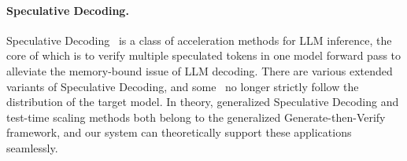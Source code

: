 \paragraph{Speculative Decoding.} Speculative Decoding~\cite{spec-decode,specinfer,zengyixiao-sd} is a class of acceleration methods for LLM inference, the core of which is to verify multiple speculated tokens in one model forward pass to alleviate the memory-bound issue of LLM decoding. There are various extended variants of Speculative Decoding, and some~\cite{hao2024hybrid,reward-guided-sd} no longer strictly follow the distribution of the target model. In theory, generalized Speculative Decoding and test-time scaling methods both belong to the generalized Generate-then-Verify framework, and our system can theoretically support these applications seamlessly.

